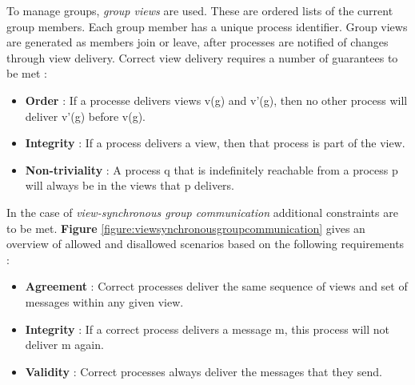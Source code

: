 To manage groups, \emph{group views} are used. These are ordered lists of the current group members. Each group member has a unique process identifier. Group views are generated as members join or leave, after processes are notified of changes through view delivery. Correct view delivery requires a number of guarantees to be met \cite{Coulouris:2011:DSC:2029110}:
\begin{itemize}
	\item \textbf{Order} : If a processe delivers views v(g) and v'(g), then no other process will deliver v'(g) before v(g).
	\item \textbf{Integrity} : If a process delivers a view, then that process is part of the view.
	\item \textbf{Non-triviality} : A process q that is indefinitely reachable from a process p will always be in the views that p delivers.
\end{itemize}
In the case of \emph{view-synchronous group communication} additional constraints are to be met. \textbf{Figure} \ref{figure:viewsynchronousgroupcommunication} gives an overview of allowed and disallowed scenarios based on the following requirements \cite{Coulouris:2011:DSC:2029110}:
\begin{itemize}
	\item \textbf{Agreement} : Correct processes deliver the same sequence of views and set of messages within any given view.
	\item \textbf{Integrity} : If a correct process delivers a message m, this process will not deliver m again.
	\item \textbf{Validity} : Correct processes always deliver the messages that they send.
\end{itemize}



